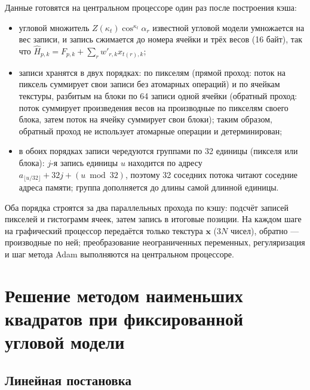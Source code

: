 Данные готовятся на центральном процессоре один раз после построения кэша:
\begin{itemize}
    \item угловой множитель $Z(\kappa_t)\cos^{\kappa_t}\alpha_r$ известной угловой модели умножается на вес записи, и запись сжимается до номера ячейки и трёх весов (16 байт), так что $\widehat{H}_{p,k}=F_{p,k}+\sum_r w'_{r,k}x_{t(r),k}$;
    \item записи хранятся в двух порядках: по пикселям (прямой проход: поток на пиксель суммирует свои записи без атомарных операций) и по ячейкам текстуры, разбитым на блоки по 64 записи одной ячейки (обратный проход: поток суммирует произведения весов на производные по пикселям своего блока, затем поток на ячейку суммирует свои блоки); таким образом, обратный проход не использует атомарные операции и детерминирован;
    \item в обоих порядках записи чередуются группами по 32 единицы (пикселя или блока): $j$-я запись единицы $u$ находится по адресу $a_{\lfloor u/32\rfloor}+32j+(u\bmod 32)$, поэтому 32 соседних потока читают соседние адреса памяти; группа дополняется до длины самой длинной единицы.
\end{itemize}
Оба порядка строятся за два параллельных прохода по кэшу: подсчёт записей пикселей и гистограмм ячеек, затем запись в итоговые позиции. На каждом шаге на графический процессор передаётся только текстура $\mathbf{x}$ ($3N$ чисел), обратно --- производные по ней; преобразование неограниченных переменных, регуляризация и шаг метода Adam выполняются на центральном процессоре.

\section{Решение методом наименьших квадратов при фиксированной угловой модели}
\label{sec:lsq}

\subsection{Линейная постановка}

